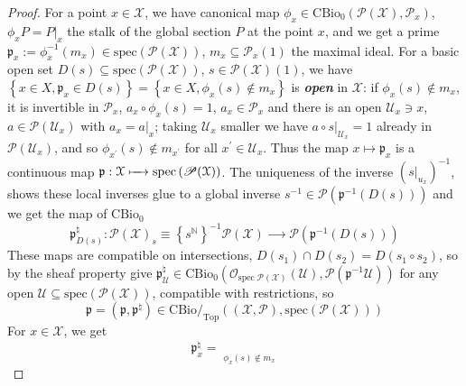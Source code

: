 \documentclass[leqno]{article}
\renewcommand{\top}{\text{Top}}
\newcommand{\xspace}{\mathcal{X}}
\newcommand{\pid}{\mathfrak{p}}
\newcommand{\myemph}[1]{{\it{\bf{#1}}}}
\newcommand{\N}{\mathbb{N}}
\newcommand{\limrightarrow}{\mathop{\underrightarrow{\text{lim}}}}
\newcommand{\biop}{\mathscr{P}}
\numberwithin{equation}{section}
\begin{document}
\begin{proof}
				For a point $x\in \xspace$, we have canonical map $\phi_x\in \text{CBio}_0\left(
				\biop(\xspace),\biop_{x} \right)$, $\phi_{x}P=P|_{x}$ the stalk of the global
				section $P$ at the point $x$, and we get a prime
				$\pid_{x}:=\phi_{x}^{-1}(m_{x})\in \text{spec}\left(\biop(\xspace)\right)$, $m_{x}\subseteq
				\biop_{x}(1)$ the maximal ideal. For a basic open set $D(s)\subseteq
				\text{spec}\left(\biop(\xspace)\right)$, $s\in \biop(\xspace)(1)$, we have $\left\{ x\in
								X,\pid_{x}\in D(s)
				\right\}=\left\{ x\in X,\phi_{x}(s)\not\in m_{x} \right\}$ is \myemph{open} in
				$\xspace$: if $\phi_{x}(s)\not\in m_{x}$, it is invertible in $\biop_{x}$,
				$a_{x}\circ \phi_{x}(s)=1$, $a_{x}\in\biop_{x}$ and there is an open
				$\mathscr{U}_{x}\ni x$,
				$a\in \biop(\mathscr{U}_{x})$ with $a_{x}=a|_{x}$; taking $\mathscr{U}_{x}$ smaller we have $a\circ
				s|_{\mathscr{U}_{x}}=1$ already in $\biop(\mathscr{U}_x)$, and so $\phi_{x^{\prime}}(s)\not\in
				m_{x^{\prime}}$ for all $x^{\prime}\in \mathscr{U}_{x}$. Thus the map
				$x\mapsto\pid_{x}$ is a continuous map
				$\pid:\xspace\xmapsto{\quad}\text{spec}\left(\biop(\xspace)\right)$.
				The uniqueness of the inverse $\left( s|_{u_{x}} \right)^{-1}$, shows these
				local inverses glue to a global inverse $s^{-1}\in \biop\left( \pid^{-1}\left(
				D(s) \right) \right)$ and we get the map of $\text{CBio}_0$
				\begin{equation}
								\pid_{D(s)}^{\natural}: \biop(\xspace)_{s}\equiv \left\{ s^{\N}
								\right\}^{-1}\biop(\xspace)\xrightarrow{\qquad}\biop\left(\pid^{-1}\left(
																D(s)
								\right)\right)
								\label{eq:7.4}
				\end{equation}
				These maps are compatible on intersections, $D(s_{1})\cap D(s_{2})=D(s_{1}\circ
				s_{2})$, so by the sheaf property give $\pid_{\mathscr{U}}^{\natural}\in
				\text{CBio}_0\left(
								\mathscr{O}_{\text{spec}\; \biop(\xspace)}(\mathscr{U}),
								\biop(\pid^{-1}\mathscr{U})
				\right)$ for any open $\mathscr{U}\subseteq \text{spec}\left(\biop(\xspace)\right)$, 
				compatible with restrictions, so 
				\begin{equation}
								\pid = (\pid,\pid^{\natural})\in \text{CBio}/_{\top}\left(
								(\xspace,\biop),\text{spec}\left(\biop(\xspace)\right) \right)
								\label{eq:7.5}
				\end{equation}
				For $x\in\xspace$, we get 
				\begin{equation}
								\pid_{x}^{\natural}=\limrightarrow\limits_{\phi_{x}(s)\not\in m_{x}}

\end{equation}
\end{proof}
\end{document}
